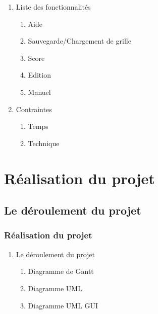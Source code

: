 \documentclass[12pt]{beamer}
\begin{document}
   \begin{frame}
   \begin{enumerate}
   \item Liste des fonctionnalités
    
    \begin{enumerate}
                        
        \item Aide\pause
                        
        \item Sauvegarde/Chargement de grille\pause
                        
        \item Score\pause
                        
        \item Edition\pause
                        
        \item Manuel\pause
    \end{enumerate}
    
    
    \item Contraintes 
    \begin{enumerate}
        \item Temps
        \item Technique
    \end{enumerate}
    
    
    \end{enumerate}
\end{frame}


\section{Réalisation du projet}
\subsection{Le déroulement du projet}

\begin{frame}
\frametitle{Réalisation du projet}
 \begin{enumerate}
  \item Le déroulement du projet
    \begin{enumerate}
        \item Diagramme de Gantt
        \item Diagramme UML
	\item Diagramme UML GUI
    \end{enumerate}
 \end{enumerate}
\end{frame}
\end{document}
